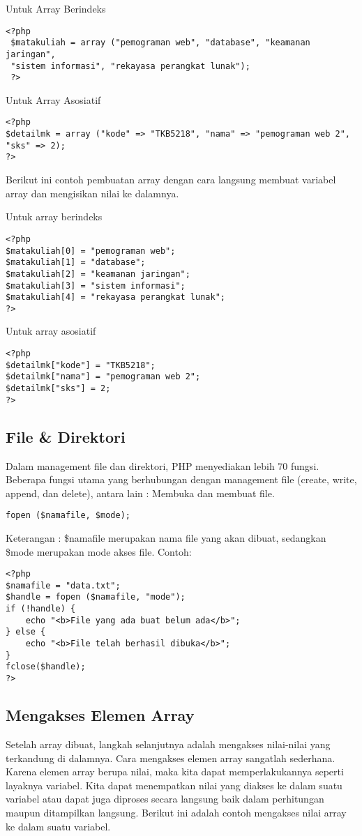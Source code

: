 \item{Untuk Array Berindeks}
\begin{lstlisting}
<?php
 $matakuliah = array ("pemograman web", "database", "keamanan jaringan",
 "sistem informasi", "rekayasa perangkat lunak");
 ?>
\end{lstlisting}

\item{Untuk Array Asosiatif}
\begin{lstlisting}
<?php
$detailmk = array ("kode" => "TKB5218", "nama" => "pemograman web 2", "sks" => 2);
?>
\end{lstlisting}

Berikut ini contoh pembuatan array dengan cara langsung membuat variabel array dan mengisikan nilai ke dalamnya.

\item{Untuk array berindeks}
\begin{lstlisting}
<?php 
$matakuliah[0] = "pemograman web"; 
$matakuliah[1] = "database"; 
$matakuliah[2] = "keamanan jaringan"; 
$matakuliah[3] = "sistem informasi"; 
$matakuliah[4] = "rekayasa perangkat lunak"; 
?>
\end{lstlisting}

\item{Untuk array asosiatif}
\begin{lstlisting}
<?php 
$detailmk["kode"] = "TKB5218"; 
$detailmk["nama"] = "pemograman web 2"; 
$detailmk["sks"] = 2; 
?>
\end{lstlisting}

\subsection{File & Direktori}
Dalam management file dan direktori, PHP menyediakan lebih 70 fungsi. Beberapa fungsi utama yang berhubungan dengan management file (create, write, append, dan delete), antara lain : Membuka dan membuat file.
\begin{lstlisting}
fopen ($namafile, $mode);
\end{lstlisting}
Keterangan :
\$namafile merupakan nama file yang akan dibuat, sedangkan \$mode merupakan mode akses file. Contoh:
\begin{lstlisting}
<?php
$namafile = "data.txt";
$handle = fopen ($namafile, "mode");
if (!handle) {
	echo "<b>File yang ada buat belum ada</b>";
} else {
	echo "<b>File telah berhasil dibuka</b>";
}
fclose($handle);
?>
\end{lstlisting}

\subsection{Mengakses Elemen Array}
Setelah array dibuat, langkah selanjutnya adalah mengakses nilai-nilai yang terkandung di dalamnya.
Cara mengakses elemen array sangatlah sederhana. Karena elemen array berupa nilai, maka kita dapat
memperlakukannya seperti layaknya variabel.
Kita dapat menempatkan nilai yang diakses ke dalam suatu variabel atau dapat juga diproses secara
langsung baik dalam perhitungan maupun ditampilkan langsung.
Berikut ini adalah contoh mengakses nilai array ke dalam suatu variabel.


